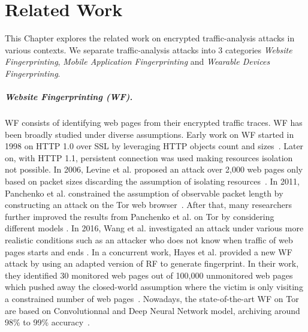 \chapter{Related Work}
\label{chap:related_work}
This Chapter explores the related work on encrypted traffic-analysis attacks in various contexts. We separate traffic-analysis attacks into 3 categories \textit{Website Fingerprinting}, \textit{Mobile Application Fingerprinting} and \textit{Wearable Devices Fingerprinting}.

\paragraph{Website Fingerprinting (WF).} WF consists of identifying web pages from their encrypted traffic traces. WF has been broadly studied under diverse assumptions. Early work on WF started in 1998 on HTTP 1.0 over SSL by leveraging HTTP objects count and sizes~\cite{cheng1998traffic, 10.5555/829514.830535}.  Later on, with HTTP 1.1, persistent connection was used making resources isolation not possible. In 2006, Levine et al. proposed an attack over 2,000 web pages only based on packet sizes discarding the assumption of isolating resources~\cite{liberatore2006inferring}. In 2011, Panchenko et al. constrained the assumption of observable packet length by constructing an attack on the Tor web browser~\cite{10.1145/2046556.2046570}. After that, many researchers further improved the results from Panchenko et al. on Tor by considering different models \cite{cai2012touching, 10.1145/2517840.2517851, 184463}. In 2016, Wang et al. investigated an attack under various more realistic conditions such as an attacker who does not know when traffic of web pages starts and ends \cite{OnRealisticallyAttackingTorwithWebsiteFingerprinting}. In a concurrent work, Hayes et al. provided a new WF attack by using an adapted version of RF to generate fingerprint. In their work, they identified 30 monitored web pages out of 100,000 unmonitored web pages which pushed away the closed-world assumption where the victim is only visiting a constrained number of web pages~\cite{k-fingerprinting}. Nowadays, the state-of-the-art WF on Tor are based on Convolutionnal and Deep Neural Network model, archiving around 98\% to 99\% accuracy~\cite{he2018deep, bhat2019var, rahman2019tik}. 



